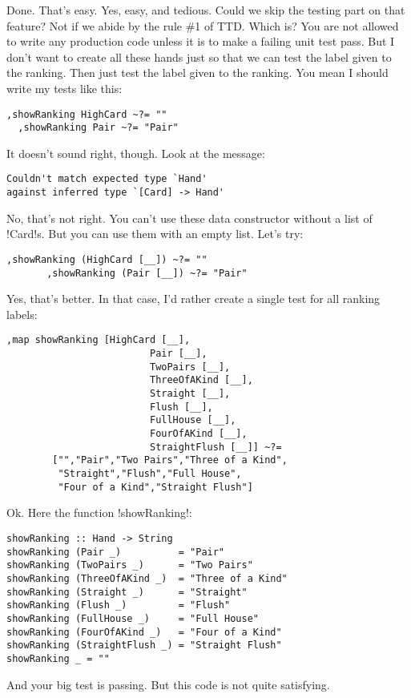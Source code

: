 \success Done. That's easy.
\lhN Yes, easy, and tedious. Could we skip the testing part on that feature?
\lhA Not if we abide by the rule \#1 of TTD.
\lhN Which is?
\lhA You are not allowed to write any production code unless it is to make a failing unit test pass.
\lhN But I don't want to create all these hands just so that we can test the label given to the ranking.
\lhA Then just test the label given to the ranking.
\lhN You mean I should write my tests like this:
\begin{lstlisting}[frame=single]
  ,showRanking HighCard ~?= ""
  ,showRanking Pair ~?= "Pair"
\end{lstlisting}
It doesn't sound right, though. Look at the message:
\begin{small}
\begin{verbatim}
Couldn't match expected type `Hand'
against inferred type `[Card] -> Hand'
\end{verbatim}
\end{small}
\lhA \error No, that's not right. You can't use these data constructor without a list of \il!Card!s.
But you can use them with an empty list. 
\lhN Let's try:
\begin{lstlisting}[frame=single]
       ,showRanking (HighCard [__]) ~?= ""
       ,showRanking (Pair [__]) ~?= "Pair"
\end{lstlisting}
\lhA \success Yes, that's better.
\lhN In that case, I'd rather create a single test for all ranking labels:
\begin{lstlisting}[frame=single]
       ,map showRanking [HighCard [__],
                         Pair [__],
                         TwoPairs [__],
                         ThreeOfAKind [__],
                         Straight [__],
                         Flush [__],
                         FullHouse [__],
                         FourOfAKind [__],
                         StraightFlush [__]] ~?=
        ["","Pair","Two Pairs","Three of a Kind",
         "Straight","Flush","Full House",
         "Four of a Kind","Straight Flush"]
\end{lstlisting}
\lhA Ok. Here the function \il!showRanking!:
\begin{lstlisting}[frame=single]
showRanking :: Hand -> String
showRanking (Pair _)          = "Pair" 
showRanking (TwoPairs _)      = "Two Pairs" 
showRanking (ThreeOfAKind _)  = "Three of a Kind" 
showRanking (Straight _)      = "Straight" 
showRanking (Flush _)         = "Flush" 
showRanking (FullHouse _)     = "Full House" 
showRanking (FourOfAKind _)   = "Four of a Kind"
showRanking (StraightFlush _) = "Straight Flush"
showRanking _ = ""
\end{lstlisting}
\success And your big test is passing. But this code is not quite satisfying.

\lhend
